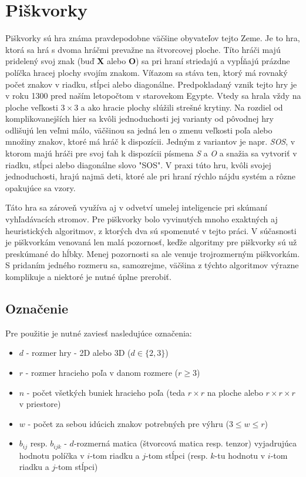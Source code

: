 \section{Piškvorky}\label{sec:tic-tac-toe}

Piškvorky sú hra známa pravdepodobne väčšine obyvateľov tejto Zeme.
Je to hra, ktorá sa hrá s dvoma hráčmi prevažne na štvorcovej ploche.
Títo hráči majú pridelený svoj znak (buď \textbf{X} alebo \textbf{O}) sa pri hraní striedajú a vypĺňajú prázdne políčka
hracej plochy svojím znakom.
Víťazom sa stáva ten, ktorý má rovnaký počet znakov v riadku, stĺpci alebo diagonálne.
Predpokladaný vznik tejto hry je v roku 1300 pred naším letopočtom v starovekom
Egypte.\cite{tic_tac_toe_first_appearance}
Vtedy sa hrala vždy na ploche veľkosti $3 \times 3$ a ako hracie plochy slúžili strešné krytiny.
Na rozdiel od komplikovanejších hier sa kvôli jednoduchosti jej varianty od pôvodnej hry odlišujú len veľmi
málo,\cite{tic_tac_toe_variants} väčšinou sa jedná len o zmenu veľkosti poľa alebo množiny znakov, ktoré má hráč k
dispozícii.
Jedným z variantov je napr. \emph{SOS}, v ktorom majú hráči pre svoj ťah k dispozícii písmena \emph{S} a \emph{O} a
snažia sa vytvoriť v riadku, stĺpci alebo diagonálne slovo "SOS".\cite{tic_tac_toe_sos}
V praxi túto hru, kvôli svojej jednoduchosti, hrajú najmä deti, ktoré ale pri hraní rýchlo nájdu systém a rôzne
opakujúce sa vzory.

Táto hra sa zároveň využíva aj v odvetví umelej inteligencie pri skúmaní vyhľadávacích stromov.
Pre piškvorky bolo vyvinutých mnoho exaktných aj heuristických algoritmov, z ktorých dva sú spomenuté v tejto práci.
V súčasnosti je piškvorkám venovaná len malá pozornosť, keďže algoritmy pre piškvorky sú už preskúmané do hĺbky.
Menej pozornosti sa ale venuje trojrozmerným piškvorkám.
S pridaním jedného rozmeru sa, samozrejme, väčšina z týchto algoritmov výrazne komplikuje a niektoré je nutné úplne
prerobiť.

\subsection{Označenie}\label{subsec:label}

Pre použitie je nutné zaviesť nasledujúce označenia:
\begin{itemize}
    \item $d$ - rozmer hry - 2D alebo 3D ($d \in \{2,3\}$)
    \item $r$ - rozmer hracieho poľa v danom rozmere ($r \geq 3$)
    \item $n$ - počet všetkých buniek hracieho poľa (teda $r \times r$ na ploche alebo $r \times r \times r$ v
    priestore)
    \item $w$ - počet za sebou idúcich znakov potrebných pre výhru ($3 \leq w \leq r$)
    \item $b_{ij}$ resp. $b_{ijk}$ - $d$-rozmerná matica (štvorcová matica resp. tenzor) vyjadrujúca hodnotu políčka v
    $i$-tom riadku a $j$-tom stĺpci (resp. $k$-tu hodnotu v $i$-tom riadku a $j$-tom stĺpci)
\end{itemize}

